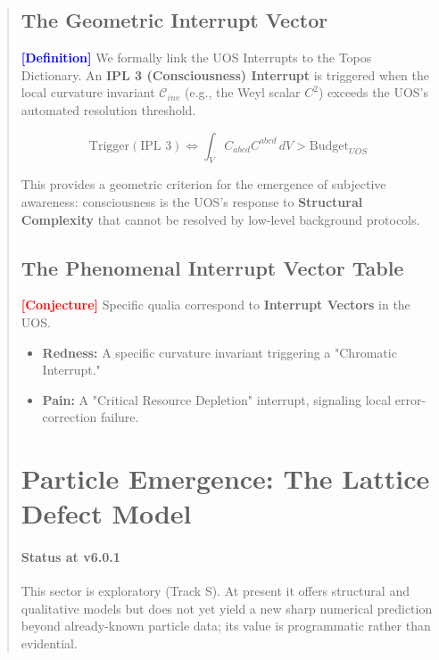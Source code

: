 \documentclass[11pt,titlepage]{article}
\newcommand{\curvature}{\mathcal{C}}
\newcommand{\tagdef}{\textcolor{blue}{\textbf{[Definition]}} }
\newcommand{\tagconj}{\textcolor{red}{\textbf{[Conjecture]}} }
\begin{document}
\begin{abstract}
\subsection{The Geometric Interrupt Vector}
\tagdef We formally link the UOS Interrupts to the Topos Dictionary. An \textbf{IPL 3 (Consciousness) Interrupt} is triggered when the local curvature invariant $\curvature_{inv}$ (e.g., the Weyl scalar $C^2$) exceeds the UOS's automated resolution threshold.

\begin{equation}
\text{Trigger}(\text{IPL 3}) \iff \int_{V} C_{abcd}C^{abcd} \, dV > \text{Budget}_{UOS}
\end{equation}

This provides a geometric criterion for the emergence of subjective awareness: consciousness is the UOS's response to \textbf{Structural Complexity} that cannot be resolved by low-level background protocols.

\subsection{The Phenomenal Interrupt Vector Table}
\tagconj Specific qualia correspond to \textbf{Interrupt Vectors} in the UOS.
\begin{itemize}
    
\item \textbf{Redness:} A specific curvature invariant triggering a "Chromatic Interrupt."
    
\item \textbf{Pain:} A "Critical Resource Depletion" interrupt, signaling local error-correction failure.
\end{itemize}


\section{Particle Emergence: The Lattice Defect Model}
\paragraph{Status at v6.0.1} This sector is exploratory (Track S). At present it offers structural and qualitative models but does not yet yield a new sharp numerical prediction beyond already-known particle data; its value is programmatic rather than evidential.\n


\end{abstract}
\end{document}
